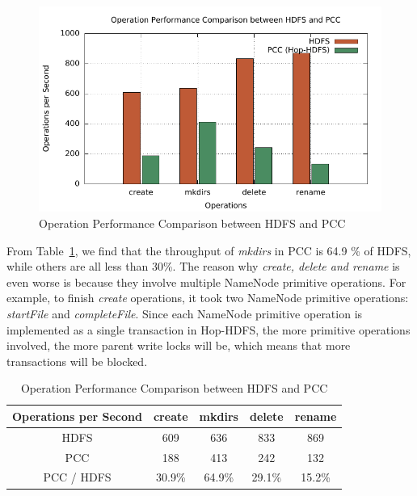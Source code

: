 \begin{figure}[h]
	\centering
	\includegraphics[width=\linewidth]{figs/nn_100.pdf}
	\caption{Operation Performance Comparison between HDFS and PCC}
	\label{fig:nntp}
\end{figure}

\noindent From Table~\ref{table:nntpb}, we find that the throughput of \textit{mkdirs} in PCC is 64.9 \% of HDFS, while others are all less than 30\%. The reason why \textit{create, delete and rename} is even worse is because they involve multiple NameNode primitive operations. For example, to finish \textit{create} operations, it took two NameNode primitive operations: \textit{startFile} and \textit{completeFile}. Since each NameNode primitive operation is implemented as a single transaction in Hop-HDFS, the more primitive operations involved, the more parent write locks will be, which means that more transactions will be blocked.
\begin{table}[h]
	\centering
	\begin{tabular}{|c|c|c|c|c|}
		\hline
		\textbf{Operations per Second} & \textbf{create} & \textbf{mkdirs} & \textbf{delete} & \textbf{rename} \\ \hline
		HDFS                           & 609             & 636             & 833             & 869             \\ \hline
		PCC                 & 188             & 413             & 242             & 132             \\ \hline
		PCC / HDFS              & 30.9\%          & 64.9\%          & 29.1\%          & 15.2\%          \\ \hline
	\end{tabular}
	\caption{Operation Performance Comparison between HDFS and PCC}
	\label{table:nntpb}
\end{table}

